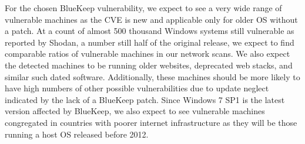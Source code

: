 For the chosen BlueKeep vulnerability, we expect to see a very wide range of vulnerable machines as the CVE is new and applicable only for older OS without a patch. At a count of almost 500 thousand Windows systems still vulnerable as reported by Shodan, a number still half of the original release, we expect to find comparable ratios of vulnerable machines in our network scans. We also expect the detected machines to be running older websites, deprecated web stacks, and similar such dated software. Additionally, these machines should be more likely to have high numbers of other possible vulnerabilities due to update neglect indicated by the lack of a BlueKeep patch. Since Windows 7 SP1 is the latest version affected by BlueKeep, we also expect to see vulnerable machines congregated in countries with poorer internet infrastructure as they will be those running a host OS released before 2012.